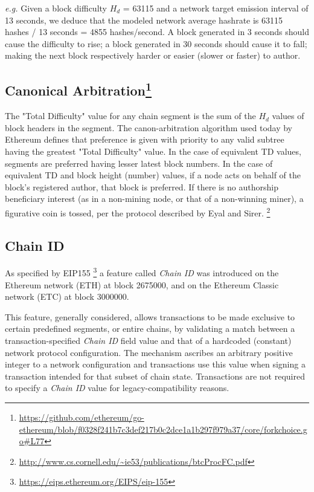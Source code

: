 \documentclass[11pt]{article}
\theoremstyle{plain}
\begin{document}
\textit{e.g.} Given a block difficulty $H_d$ = 63115 and a network target
emission interval of 13 seconds, we deduce that the modeled network average
hashrate is 63115 hashes / 13 seconds = 4855 hashes/second. A block generated
in 3 seconds should cause the difficulty to rise; a block generated in 30
seconds should cause it to fall; making the next block respectively harder or
easier (slower or faster) to author.

\subsection{\small{Canonical Arbitration\footnote{\url{https://github.com/ethereum/go-ethereum/blob/f0328f241b7c3def217b0c2dce1a1b297f979a37/core/forkchoice.go#L77}}}}

The "Total Difficulty" value for any chain segment is the sum of the $H_d$ 
values of block headers in the segment.
The canon-arbitration algorithm used today by Ethereum defines
that preference is given with priority to any valid subtree having the greatest "Total Difficulty" value.
In the case of equivalent TD values, segments are preferred having lesser latest block numbers.
In the case of equivalent TD and block height (number) values, if a node acts 
on behalf of the block's registered author, that block is preferred.
If there is no authorship beneficiary interest (as in a non-mining node, or 
that of a non-winning miner), a figurative coin is tossed, per the protocol 
described by Eyal and Sirer.\nolinebreak
\footnote{\url{http://www.cs.cornell.edu/~ie53/publications/btcProcFC.pdf}}

\subsection{\small{Chain ID}}

As specified by EIP155\nolinebreak
\footnote{\url{https://eips.ethereum.org/EIPS/eip-155}} a feature called
\textit{Chain ID} was introduced on the Ethereum network (ETH) at block
2675000, and on the Ethereum Classic network (ETC) at block 3000000.

This feature, generally considered, allows transactions to be made exclusive to
certain predefined segments, or entire chains, by validating a match between a
transaction-specified \textit{Chain ID} field value and that of a hardcoded
(constant) network protocol configuration.
The mechanism ascribes an arbitrary positive integer to a network configuration
and transactions use this value when signing a transaction intended for that
subset of chain state.
Transactions are not required to specify a \textit{Chain ID} value for
legacy-compatibility reasons.
\end{document}
